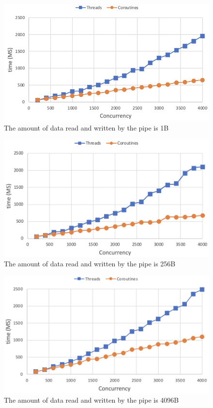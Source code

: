\documentclass[10pt]{article}
\begin{document}
\begin{figure}[ht]
\begin{center}
\centerline{\includegraphics[width=\columnwidth]{1B.png}}
\caption{The amount of data read and written by the pipe is 1B}
\label{1B}
\end{center}
\end{figure}

\begin{figure}[ht]
\begin{center}
\centerline{\includegraphics[width=\columnwidth]{256B.png}}
\caption{The amount of data read and written by the pipe is 256B}
\label{256B}
\end{center}
\end{figure}

\begin{figure}[ht]
\begin{center}
\centerline{\includegraphics[width=\columnwidth]{4096B.png}}
\caption{The amount of data read and written by the pipe is 4096B}
\label{4096B}
\end{center}
\end{figure}
\end{document}
